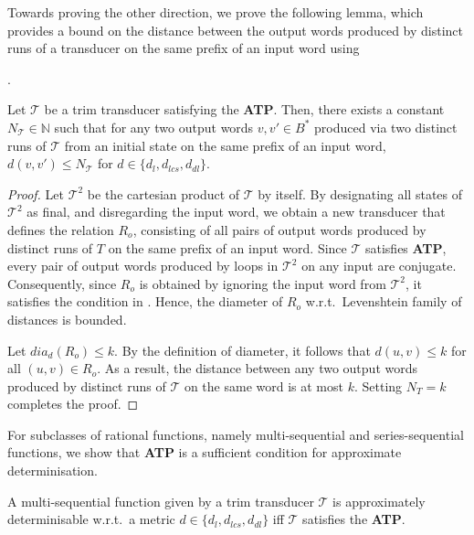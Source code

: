 \documentclass[a4paper,UKenglish,cleveref, autoref, thm-restate,authorcolumns, colorlinks]{lipics-v2021}
\newcommand\calT{\mathcal{T}}
\newcommand\dia[2]{\ensuremath{\mathit{dia}_{#2}(#1)}}
\newcommand{\ATP}[0]{\textbf{ATP}}
\begin{document}
Towards proving the other direction, we prove the following lemma, which provides a bound on the distance between the output words produced by distinct runs of a transducer on the same prefix of an input word using {. 


\begin{lemma}\label{lem:ATPtobound}
       Let $\calT$ be a trim transducer satisfying the \ATP{}. Then, there exists a constant $N_\calT \in \mathbb{N}$ such that for any two output words $v, v' \in B^*$ produced via two distinct runs of $\calT$ from an initial state on the same prefix of an input word, $d(v,v') \leq N_\calT$ for $d \in \{d_l,d_{lcs},d_{dl}\}$.
    \end{lemma}

    \begin{proof}
     Let $\calT^2$ be the cartesian product of $\calT$ by itself. By designating all states of $\calT^2$ as final, and disregarding the input word, we obtain a new transducer that defines the relation $R_o$, consisting of all pairs of output words produced by distinct runs of $T$ on the same prefix of an input word.  Since $\calT$ satisfies \ATP{}, every pair of output words produced by loops in $\calT^2$ on any input are conjugate. Consequently, since $R_o$ is obtained by ignoring the input word from $\calT^2$, it satisfies the condition in . Hence, the diameter of $R_o$ w.r.t.~Levenshtein family of distances is bounded. 
     
     Let $\dia{R_o}{d} \leq k$. By the definition of diameter, it follows that $d(u,v) \leq k$ for all $(u,v) \in R_o$. As a result, the distance between any two output words produced by distinct runs of $\calT$ on the same word is at most $k$. Setting $N_T = k$ completes the proof.
    \end{proof}

For subclasses of rational functions, namely multi-sequential and series-sequential functions, we show that \ATP{} is a sufficient condition for approximate determinisation. 
\begin{lemma} \label{lemma:multiseqapprox}
    A multi-sequential function given by a trim transducer $\calT$ is approximately determinisable w.r.t.~a metric $d \in \{d_l,d_{lcs},d_{dl}\}$ iff $\calT$ satisfies the \ATP{}.
\end{lemma}

}
\end{document}
